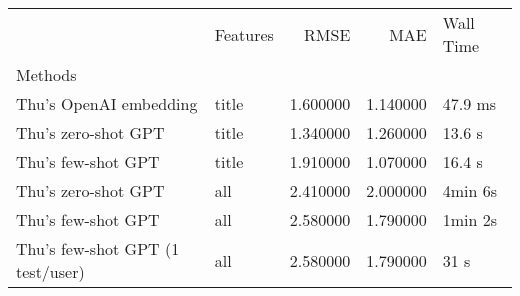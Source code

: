 \begin{tabular}{llrrl}
 & Features & RMSE & MAE & Wall Time \\
Methods &  &  &  &  \\
Thu's OpenAI embedding & title & 1.600000 & 1.140000 & 47.9 ms \\
Thu's zero-shot GPT & title & 1.340000 & 1.260000 & 13.6 s \\
Thu's few-shot GPT & title & 1.910000 & 1.070000 & 16.4 s \\
Thu's zero-shot GPT & all & 2.410000 & 2.000000 & 4min 6s \\
Thu's few-shot GPT & all & 2.580000 & 1.790000 & 1min 2s \\
Thu's few-shot GPT (1 test/user) & all & 2.580000 & 1.790000 & 31 s \\
\end{tabular}
